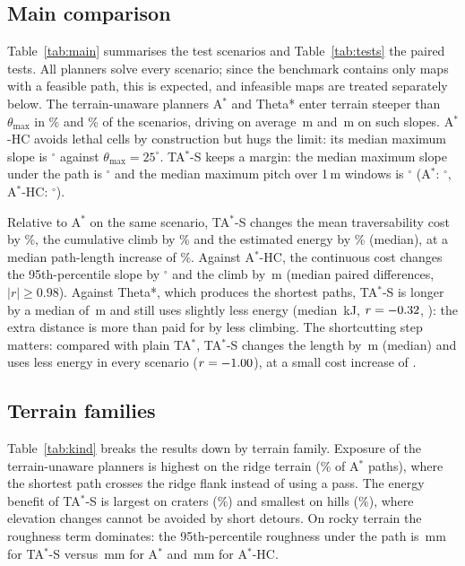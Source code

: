 \documentclass[conference]{IEEEtran}
\newcommand{\TAS}{TA$^*$-S}
\newcommand{\TA}{TA$^*$}
\newcommand{\Astar}{A$^*$}
\newcommand{\HC}{A$^*$-HC}
\newcommand{\thmax}{\theta_{\max}}
\begin{document}
\subsection{Main comparison}
Table~\ref{tab:main} summarises the \nTest{} test scenarios and
Table~\ref{tab:tests} the paired tests. All planners solve every scenario; since the benchmark contains only maps
with a feasible path, this is expected, and infeasible maps are treated
separately below.
The terrain-unaware planners \Astar{} and Theta* enter terrain steeper than
$\thmax$ in \exposedA\% and \exposedTheta\% of the scenarios, driving on
average \steepMeanA\,m and \steepMeanTheta\,m on such slopes. \HC{} avoids
lethal cells by construction but hugs the limit: its median maximum slope is
\maxSlopeAHC$^\circ$ against $\thmax=25^\circ$. \TAS{} keeps a margin: the
median maximum slope under the path is \maxSlopeTAS$^\circ$ and the median
maximum pitch over 1\,m windows is \maxPitchTAS$^\circ$ (\Astar: \maxPitchA$^\circ$,
\HC: \maxPitchAHC$^\circ$).

Relative to \Astar{} on the same scenario, \TAS{} changes the mean
traversability cost by \costRelTAS\%, the cumulative climb by
\climbRelTAS\% and the estimated energy by \energyRelTAS\% (median), at a
median path-length increase of \lenRelTAS\%. Against \HC, the continuous cost
changes the 95th-percentile slope by \dTASAHCpNineFiveslope$^\circ$ and the
climb by \dTASAHCclimb\,m (median paired differences, $|r|\ge 0.98$). Against
Theta*, which produces the shortest paths, \TAS{} is longer by a median of
\dTASThetalengthxy\,m and still uses slightly less energy (median
\dTASThetaenergykj\,kJ, $r=-0.32$, \pexprTASThetaenergykj): the
extra distance is more than paid for by less climbing.
The shortcutting step matters: compared with plain \TA{}, \TAS{} changes the
length by \dTASTAlengthxy\,m (median) and uses less energy in every scenario
($r=-1.00$), at a small cost increase of \dTASTAmeancost.




\subsection{Terrain families}
Table~\ref{tab:kind} breaks the results down by terrain family. Exposure of
the terrain-unaware planners is highest on the ridge terrain
(\exposedAridge\% of \Astar{} paths), where the shortest path crosses the ridge
flank instead of using a pass. The energy benefit of \TAS{} is largest on
craters (\energyRelTAScraters\%) and smallest on hills
(\energyRelTAShills\%), where elevation changes cannot be avoided by short
detours. On rocky terrain the roughness term dominates: the
95th-percentile roughness under the path is \roughRockyTAS\,mm for \TAS{}
versus \roughRockyA\,mm for \Astar{} and \roughRockyAHC\,mm for \HC.
\end{document}

